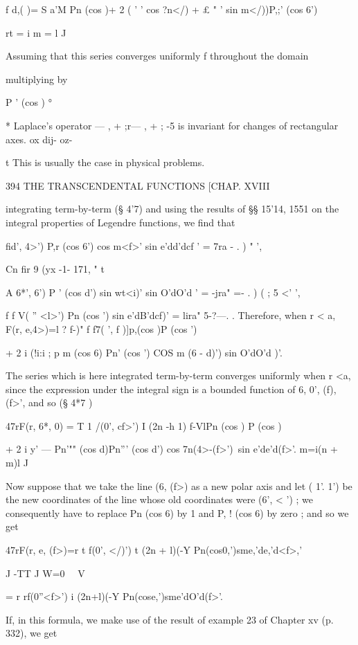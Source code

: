f d,( )= S a'M Pn (cos )+ 2 ( ' ' cos ?n</) + £ " ' sin m</))P,;' (cos
6')

rt = i m = l J

Assuming that this series converges uniformly f throughout the domain

multiplying by

P ' (cos ) °%

* Laplace's operator — , + ;r— , + ; -5 is invariant for changes of
rectangular axes. ox dij- oz-

t This is usually the case in physical problems.



394 THE TRANSCENDENTAL FUNCTIONS [CHAP. XVIII

integrating term-by-term (§ 4'7) and using the results of §§ 15'14,
1551 on the integral properties of Legendre functions, we find that

fid', 4>') P,r (cos 6') cos m<f>' sin e'dd'dcf ' = 7ra - . ) " ',

Cn fir 9 (yx -1- 171, " t

A 6*', 6') P ' (cos d') sin wt<i)' sin O'dO'd ' = -jra" =- . ) ( ; 5
<' ',

f f V( '' <l>') Pn (cos ') sin e'dB'dcf)' = lira" 5-?—. . Therefore,
when r < a, F(r, e,4>)=l ? f-)" f f7( ', f )]p,(cos )P (cos ')

+ 2 i (!i:i ; p m (cos 6) Pn' (cos ') COS m (6 - d)') sin O'dO'd )'.

The series which is here integrated term-by-term converges uniformly
when r <a, since the expression under the integral sign is a bounded
function of 6, 0', (f), (f>', and so (§ 4*7 )

47rF(r, 6*, 0) = T 1 /(0', cf>') I (2n -h 1) f-VlPn (cos ) P (cos )

+ 2 i y' — Pn'"" (cos d)Pn''' (cos d') cos 7n(4>-(f>')\ sin
e'de'd(f>'. m=i(n + m)l J

Now suppose that we take the line (6, (f>) as a new polar axis and let
( 1'. 1') be the new coordinates of the line whose old coordinates
were (6', < ') ; we consequently have to replace Pn (cos 6) by 1 and
P, ! (cos 6) by zero ; and so we get

47rF(r, e, (f>)=r t f(0', </)') t (2n + l)(-Y
Pn(cos0,')sme,'de,'d<f>,'

J -TT J W=0 \ \ V

= r rf(0''<f>') i (2n+l)(-Y Pn(cose,')sme'dO'd(f>'.

If, in this formula, we make use of the result of example 23 of
Chapter xv (p. 332), we get

